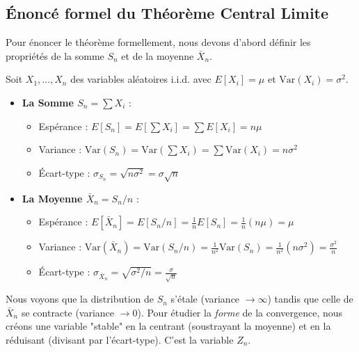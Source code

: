 \subsection{Énoncé formel du Théorème Central Limite}

Pour énoncer le théorème formellement, nous devons d'abord définir les propriétés de la somme $S_n$ et de la moyenne $\bar{X}_n$.

Soit $X_1, \dots, X_n$ des variables aléatoires i.i.d. avec $E[X_i] = \mu$ et $\text{Var}(X_i) = \sigma^2$.

\begin{itemize}
    \item \textbf{La Somme $S_n = \sum X_i$} :
    \begin{itemize}
        \item Espérance : $E[S_n] = E[\sum X_i] = \sum E[X_i] = n\mu$
        \item Variance : $\text{Var}(S_n) = \text{Var}(\sum X_i) = \sum \text{Var}(X_i) = n\sigma^2$
        \item Écart-type : $\sigma_{S_n} = \sqrt{n\sigma^2} = \sigma\sqrt{n}$
    \end{itemize}
    
    \item \textbf{La Moyenne $\bar{X}_n = S_n / n$} :
    \begin{itemize}
        \item Espérance : $E[\bar{X}_n] = E[S_n / n] = \frac{1}{n} E[S_n] = \frac{1}{n} (n\mu) = \mu$
        \item Variance : $\text{Var}(\bar{X}_n) = \text{Var}(S_n / n) = \frac{1}{n^2} \text{Var}(S_n) = \frac{1}{n^2} (n\sigma^2) = \frac{\sigma^2}{n}$
        \item Écart-type : $\sigma_{\bar{X}_n} = \sqrt{\sigma^2 / n} = \frac{\sigma}{\sqrt{n}}$
    \end{itemize}
\end{itemize}

Nous voyons que la distribution de $S_n$ s'étale (variance $\to \infty$) tandis que celle de $\bar{X}_n$ se contracte (variance $\to 0$). Pour étudier la \textit{forme} de la convergence, nous créons une variable "stable" en la centrant (soustrayant la moyenne) et en la réduisant (divisant par l'écart-type). C'est la variable $Z_n$.

